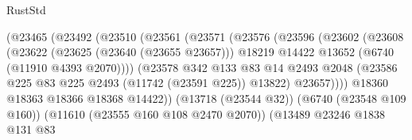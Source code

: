 \begin{lexlean}{RustStd}
\begin{coremodule}
                                      (@23465
                                        (@23492
                                          (@23510
                                            (@23561
                                              (@23571
                                                (@23576
                                                  (@23596
                                                    (@23602
                                                      (@23608
                                                        (@23622
                                                          (@23625 (@23640 (@23655 @23657)))
                                                          @18219
                                                          @14422
                                                          @13652
                                                          (@6740 (@11910 @4393 @2070))))
                                                      (@23578
                                                        @342
                                                        @133
                                                        @83
                                                        @14
                                                        @2493
                                                        @2048
                                                        (@23586
                                                          @225
                                                          @83
                                                          @225
                                                          @2493
                                                          (@11742 (@23591 @225))
                                                          @13822)
                                                        @23657))))
                                                @18360
                                                @18363
                                                @18366
                                                @18368
                                                @14422))
                                            (@13718 (@23544 @32))
                                            (@6740 (@23548 @109 @160))
                                            (@11610 (@23555 @160 @108 @2470 @2070))
                                            (@13489
                                              @23246
                                              @1838
                                              @131
                                              @83

\end{coremodule}
\end{lexlean}
